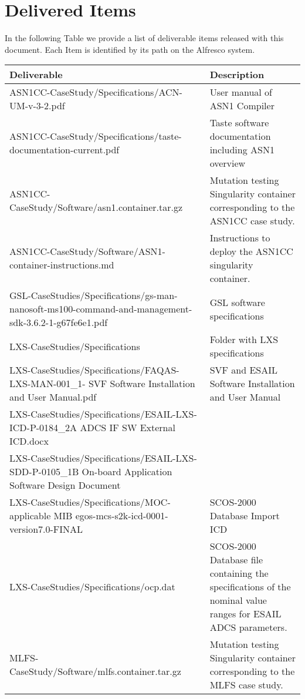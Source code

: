 
\section*{Delivered Items}
\label{sec:deliverables}

In the following Table we provide a list of deliverable items released with this document. Each Item is identified by its path on the Alfresco system.

\setlength\LTleft{0pt}
\setlength\LTright{0pt}
\tiny 
\begin{longtable}{|p{9cm}|p{6cm}@{}}
\label{table:deliverables} \\
\hline
\textbf{Deliverable}&Description\\
\hline
ASN1CC-CaseStudy/Specifications/ACN-UM-v-3-2.pdf&User manual of ASN1 Compiler\\
ASN1CC-CaseStudy/Specifications/taste-documentation-current.pdf&Taste software documentation including ASN1 overview\\
ASN1CC-CaseStudy/Software/asn1.container.tar.gz&Mutation testing Singularity container corresponding to the ASN1CC case study.\\
ASN1CC-CaseStudy/Software/ASN1-container-instructions.md&Instructions to deploy the ASN1CC singularity container.\\
\hline
GSL-CaseStudies/Specifications/gs-man-nanosoft-ms100-command-and-management-sdk-3.6.2-1-g67fe6e1.pdf&GSL software specifications\\
\hline
LXS-CaseStudies/Specifications&Folder with LXS specifications\\
LXS-CaseStudies/Specifications/FAQAS-LXS-MAN-001\_1- SVF Software Installation and User Manual.pdf&SVF and ESAIL Software Installation and User Manual\\
LXS-CaseStudies/Specifications/ESAIL-LXS-ICD-P-0184\_2A ADCS IF SW External ICD.docx&\\
LXS-CaseStudies/Specifications/ESAIL-LXS-SDD-P-0105\_1B On-board Application Software Design Document&\\
LXS-CaseStudies/Specifications/MOC-applicable MIB egos-mcs-s2k-icd-0001-version7.0-FINAL&SCOS-2000 Database Import ICD\\
LXS-CaseStudies/Specifications/ocp.dat&SCOS-2000 Database file containing the specifications of the nominal value ranges for ESAIL ADCS parameters.\\
\hline
MLFS-CaseStudy/Software/mlfs.container.tar.gz&Mutation testing Singularity container corresponding to the MLFS case study.\\

\end{longtable}
